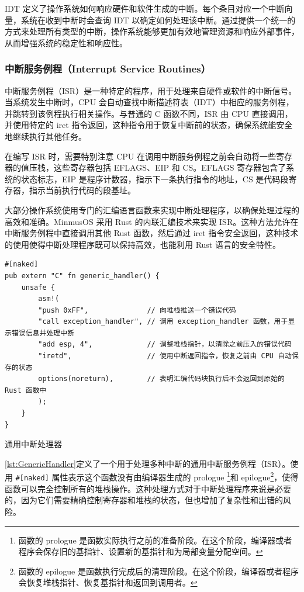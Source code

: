 IDT 定义了操作系统如何响应硬件和软件生成的中断。每个条目对应一个中断向量，系统在收到中断时会查询 IDT 以确定如何处理该中断。通过提供一个统一的方式来处理所有类型的中断，操作系统能够更加有效地管理资源和响应外部事件，从而增强系统的稳定性和响应性。

\subsubsection{中断服务例程（Interrupt Service Routines）}

中断服务例程（ISR）是一种特定的程序，用于处理来自硬件或软件的中断信号。当系统发生中断时，CPU 会自动查找中断描述符表（IDT）中相应的服务例程，并跳转到该例程执行相关操作。与普通的 C 函数不同，ISR 由 CPU 直接调用，并使用特定的 iret 指令返回，这种指令用于恢复中断前的状态，确保系统能安全地继续执行其他任务。

在编写 ISR 时，需要特别注意 CPU 在调用中断服务例程之前会自动将一些寄存器的值压栈，这些寄存器包括 EFLAGS、EIP 和 CS。EFLAGS 寄存器包含了系统的状态标志，EIP 是程序计数器，指示下一条执行指令的地址，CS 是代码段寄存器，指示当前执行代码的段基址。

大部分操作系统使用专门的汇编语言函数来实现中断处理程序，以确保处理过程的高效和准确。MinmusOS 采用 Rust 的内联汇编技术来实现 ISR。这种方法允许在中断服务例程中直接调用其他 Rust 函数，然后通过 iret 指令安全返回，这种技术的使用使得中断处理程序既可以保持高效，也能利用 Rust 语言的安全特性。

\begin{listing}[htbp]
    \begin{verbatim}
#[naked]
pub extern "C" fn generic_handler() {
    unsafe {
        asm!(
        "push 0xFF",              // 向堆栈推送一个错误代码
        "call exception_handler", // 调用 exception_handler 函数，用于显示错误信息并处理中断
        "add esp, 4",             // 调整堆栈指针，以清除之前压入的错误代码
        "iretd",                  // 使用中断返回指令，恢复之前由 CPU 自动保存的状态
        options(noreturn),        // 表明汇编代码块执行后不会返回到原始的 Rust 函数中
        );
    }
}
    \end{verbatim}
    \caption{通用中断处理器}\label{lst:GenericHandler}
\end{listing}

\cref{lst:GenericHandler}定义了一个用于处理多种中断的通用中断服务例程（ISR）。使用 \texttt{\#[naked]} 属性表示这个函数没有由编译器生成的 prologue \footnote{函数的 prologue 是函数实际执行之前的准备阶段。在这个阶段，编译器或者程序会保存旧的基指针、设置新的基指针和为局部变量分配空间。}和 epilogue\footnote{函数的 epilogue 是函数执行完成后的清理阶段。在这个阶段，编译器或者程序会恢复堆栈指针、恢复基指针和返回到调用者。}，使得函数可以完全控制所有的堆栈操作。这种处理方式对于中断处理程序来说是必要的，因为它们需要精确控制寄存器和堆栈的状态，但也增加了复杂性和出错的风险。

